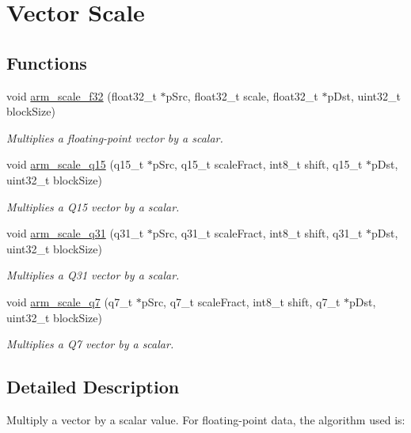 \hypertarget{group__scale}{\section{Vector Scale}
\label{group__scale}
}
\subsection*{Functions}
\begin{DoxyCompactItemize}
\item 
void \hyperlink{group__scale_ga3487af88b112f682ee90589cd419e123}{arm\-\_\-scale\-\_\-f32} (float32\-\_\-t $\ast$p\-Src, float32\-\_\-t scale, float32\-\_\-t $\ast$p\-Dst, uint32\-\_\-t block\-Size)
\begin{DoxyCompactList}\small\item\em Multiplies a floating-\/point vector by a scalar. \end{DoxyCompactList}\item 
void \hyperlink{group__scale_gafaac0e1927daffeb68a42719b53ea780}{arm\-\_\-scale\-\_\-q15} (q15\-\_\-t $\ast$p\-Src, q15\-\_\-t scale\-Fract, int8\-\_\-t shift, q15\-\_\-t $\ast$p\-Dst, uint32\-\_\-t block\-Size)
\begin{DoxyCompactList}\small\item\em Multiplies a Q15 vector by a scalar. \end{DoxyCompactList}\item 
void \hyperlink{group__scale_ga83e36cd82bf51ce35406a199e477d47c}{arm\-\_\-scale\-\_\-q31} (q31\-\_\-t $\ast$p\-Src, q31\-\_\-t scale\-Fract, int8\-\_\-t shift, q31\-\_\-t $\ast$p\-Dst, uint32\-\_\-t block\-Size)
\begin{DoxyCompactList}\small\item\em Multiplies a Q31 vector by a scalar. \end{DoxyCompactList}\item 
void \hyperlink{group__scale_gabc9fd3d37904c58df56492b351d21fb0}{arm\-\_\-scale\-\_\-q7} (q7\-\_\-t $\ast$p\-Src, q7\-\_\-t scale\-Fract, int8\-\_\-t shift, q7\-\_\-t $\ast$p\-Dst, uint32\-\_\-t block\-Size)
\begin{DoxyCompactList}\small\item\em Multiplies a Q7 vector by a scalar. \end{DoxyCompactList}\end{DoxyCompactItemize}


\subsection{Detailed Description}
Multiply a vector by a scalar value. For floating-\/point data, the algorithm used is\-:


